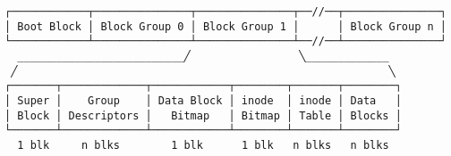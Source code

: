 \documentclass[varwidth=46.3em,crop]{standalone}
\begin{document}
\begin{verbatim}
┌────────────┬───────────────┬───────────────┬──//──┬───────────────┐
│ Boot Block │ Block Group 0 │ Block Group 1 │      │ Block Group n │
└────────────┴───────────────┴───────────────┴──//──┴───────────────┘
  __________________________╱                 ╲_____________
 ╱                                                          ╲
┌───────┬─────────────┬────────────┬────────┬───────┬────────┐
│ Super │    Group    │ Data Block │ inode  │ inode │ Data   │
│ Block │ Descriptors │   Bitmap   │ Bitmap │ Table │ Blocks │
└───────┴─────────────┴────────────┴────────┴───────┴────────┘
  1 blk     n blks        1 blk      1 blk   n blks   n blks
\end{verbatim}
\end{document}
